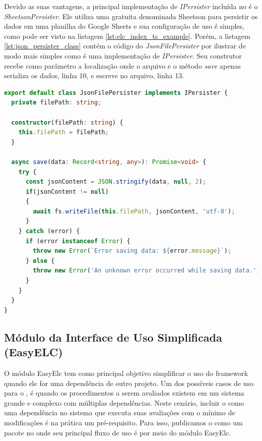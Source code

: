 \documentclass[12pt]{tcc}
\begin{document}
	Devido as suas vantagens, a principal implementação de \emph{IPersister} incluída no  é o \emph{SheetsonPersister}.
	Ele utiliza uma  gratuita denominada Sheetson para persistir os dados em uma planilha do Google Sheets e sua configuração de uso é simples, como pode ser visto na listagem \ref{lst:elc_index_ts_example}.
	Porém, a listagem \ref{lst:json_persister_class} contém o código do \emph{JsonFilePersister} por ilustrar de modo mais simples como é uma implementação de \emph{IPersister}.
	Seu construtor recebe como parâmetro a localização onde o arquivo  e o método \emph{save} apenas serializa os dados, linha 10, e escreve no arquivo, linha 13.


\begin{minipage}{\linewidth}
\begin{lstlisting}[label={lst:json_persister_class}, caption={Fragmento de código da classe \emph{JsonFilePersister} o qual implementa a camada de persistência para armazenar os resultado em um arquivo \acr{JSON}.}, language=TypeScript, breaklines=true]
export default class JsonFilePersister implements IPersister {
  private filePath: string;

  constructor(filePath: string) {
    this.filePath = filePath;
  }

  async save(data: Record<string, any>): Promise<void> {
    try {
      const jsonContent = JSON.stringify(data, null, 2);
      if(jsonContent != null)
      {
        await fs.writeFile(this.filePath, jsonContent, 'utf-8');
      }
    } catch (error) {
      if (error instanceof Error) {
        throw new Error(`Error saving data: ${error.message}`);
      } else {
        throw new Error('An unknown error occurred while saving data.');
      }
    }
  }
}
\end{lstlisting}
\end{minipage}


	\subsection{Módulo da Interface de Uso Simplificada (EasyELC)}
		\label{subsec:implemencao-easyelc}

	O módulo EasyElc tem como principal objetivo simplificar o uso do framework quando ele for uma dependência de outro projeto.
	Um dos possíveis casos de uso para o , é quando os procedimentos a serem avaliados existem em um sistema grande e complexo com múltiplas dependências.
	Neste cenário, incluir o  como uma dependência no sistema que executa suas avaliações com o mínimo de modificações é na prática um pré-requisito.
	Para isso, publicamos o  como um pacote no  onde seu principal fluxo de uso é por meio do módulo EasyElc.
\end{document}

